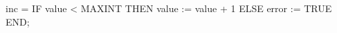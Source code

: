 \documentclass[10pt,a4paper]{article}
\begin{document}
\begin{small}
\begin{pascalcode}
inc = IF value < MAXINT THEN value := value + 1
      ELSE error := TRUE END;
\end{pascalcode}
\end{small}
\end{document}
